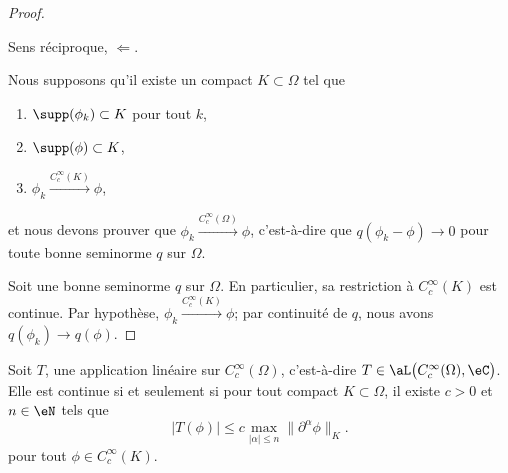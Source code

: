 \begin{proof}
	\begin{proofpart}
		Sens réciproque, \( \Leftarrow\).
	\end{proofpart}
	Nous supposons qu'il existe un compact \( K\subset \Omega\) tel que
	\begin{enumerate}
		\item \( \supp(\phi_k)\subset K\) pour tout \( k\),
		\item
		      \( \supp(\phi)\subset K\),
		\item
		      \( \phi_k\stackrel{ C^{\infty}_c(K)}{\longrightarrow} \phi\),
	\end{enumerate}
	et nous devons prouver que \( \phi_k\stackrel{ C^{\infty}_c(\Omega)}{\longrightarrow} \phi\), c'est-à-dire que \( q(\phi_k-\phi)\to 0\) pour toute bonne seminorme \( q\) sur \( \Omega\).

	Soit une bonne seminorme \( q\) sur \( \Omega\). En particulier, sa restriction à \( C^{\infty}_c(K)\) est continue. Par hypothèse, \( \phi_k\stackrel{ C^{\infty}_c(K)}{\longrightarrow} \phi\); par continuité de \( q\), nous avons \( q(\phi_k)\to q(\phi)\).
\end{proof}

\begin{theorem}		\label{THOooDFNAooPnDSNN}
	Soit \( T\), une application linéaire sur \( C^{\infty}_c(\Omega)\), c'est-à-dire \( T\in \aL\big( C^{\infty}_c(\Omega), \eC \big)\). Elle est continue si et seulement si pour tout compact \( K\subset \Omega\), il existe \( c>0\) et \( n\in \eN\) tels que
	\begin{equation}
		| T(\phi) |\leq c\max_{| \alpha |\leq n}\| \partial^{\alpha}\phi \|_{K}.
	\end{equation}
	pour tout \( \phi\in C^{\infty}_c(K)\).
\end{theorem}

